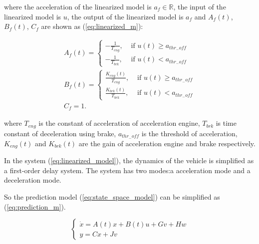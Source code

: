 \documentclass{article}
\numberwithin{equation}{section}
\begin{document}
\noindent where the acceleration of the linearized model is $a_f\in \mathbb{R}$, the input of the
linearized model is $u$, the output of the linearized model is $a_f$ and $A_f(t)$, $B_f(t)$, $C_f$ are
shown as (\ref{eq:linearized_m}):

\begin{equation}
    \begin{array}{l}\label{eq:linearized_m}
        A_{f}(t)=\left\{\begin{array}{ll}
                            -\frac{1}{T_{e n g}}, & \text { if } u(t) \geq a_{t h r_{-} o f f} \\
                            -\frac{1}{T_{b r k}}, & \text { if } u(t)<a_{t h r_{-} o f f}
                        \end{array}\right.                                  \\
        B_{f}(t)=\left\{\begin{array}{ll}
                            \frac{K_{e n g}(t)}{T_{e n g}}, & \text { if } u(t) \geq a_{t h r_{-} o f f} \\
                            \frac{K_{b r k}(t)}{T_{b r k}}, & \text { if } u(t)<a_{t h r_{-} o f f}
                        \end{array}\right. \\
        C_{f}=1 .
    \end{array}
\end{equation}

\noindent where $T_{e n g}$ is the constant of acceleration of acceleration engine,
$T_{b r k}$ is time constant of deceleration using brake, $a_{t h r_{-} o f f}$ is the threshold
of acceleration, $K_{e n g}(t)$ and $K_{b r k}(t)$ are the gain of acceleration engine and brake
respectively.

In the system (\ref{eq:linearized_model}), the dynamics of the vehicle is
simplified as a first-order delay system. The system has two modes:a
acceleration mode and a deceleration mode.

So the prediction model (\ref{eq:state_space_model}) can be simplified as
(\ref{eq:prediction_m}).

\begin{equation}
    \left\{\begin{array}{l}\label{eq:prediction_m}
        \dot{x}=A(t)x+B(t)u+Gv+Hw \\
        y=Cx+Jv
    \end{array}\right.
\end{equation}
\end{document}
